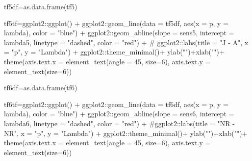 \documentclass[
  12pt,
  letterpaper,
]{book}
\newenvironment{Shaded}{\begin{snugshade}}{\end{snugshade}}
\newcommand{\AttributeTok}[1]{\textcolor[rgb]{0.40,0.45,0.13}{#1}}
\newcommand{\CommentTok}[1]{\textcolor[rgb]{0.37,0.37,0.37}{#1}}
\newcommand{\DecValTok}[1]{\textcolor[rgb]{0.68,0.00,0.00}{#1}}
\newcommand{\FunctionTok}[1]{\textcolor[rgb]{0.28,0.35,0.67}{#1}}
\newcommand{\NormalTok}[1]{\textcolor[rgb]{0.00,0.23,0.31}{#1}}
\newcommand{\OtherTok}[1]{\textcolor[rgb]{0.00,0.23,0.31}{#1}}
\newcommand{\SpecialCharTok}[1]{\textcolor[rgb]{0.37,0.37,0.37}{#1}}
\newcommand{\StringTok}[1]{\textcolor[rgb]{0.13,0.47,0.30}{#1}}
\begin{document}
\begin{Shaded}
\begin{Highlighting}[]
\NormalTok{tf5df}\OtherTok{=}\FunctionTok{as.data.frame}\NormalTok{(tf5)}

\NormalTok{tf5tf}\OtherTok{=}\NormalTok{ggplot2}\SpecialCharTok{::}\FunctionTok{ggplot}\NormalTok{() }\SpecialCharTok{+}
\NormalTok{  ggplot2}\SpecialCharTok{::}\FunctionTok{geom\_line}\NormalTok{(}\AttributeTok{data =}\NormalTok{ tf5df, }\FunctionTok{aes}\NormalTok{(}\AttributeTok{x =}\NormalTok{ p, }\AttributeTok{y =}\NormalTok{ lambda), }\AttributeTok{color =} \StringTok{"blue"}\NormalTok{) }\SpecialCharTok{+}
\NormalTok{  ggplot2}\SpecialCharTok{::}\FunctionTok{geom\_abline}\NormalTok{(}\AttributeTok{slope =}\NormalTok{ sens5, }\AttributeTok{intercept =}\NormalTok{ lambda5, }\AttributeTok{linetype =} \StringTok{"dashed"}\NormalTok{, }\AttributeTok{color =} \StringTok{"red"}\NormalTok{) }\SpecialCharTok{+}
 \CommentTok{\# ggplot2::labs(title = "J {-} A", x = "p", y = "Lambda") +}
\NormalTok{  ggplot2}\SpecialCharTok{::}\FunctionTok{theme\_minimal}\NormalTok{()}\SpecialCharTok{+}
  \FunctionTok{ylab}\NormalTok{(}\StringTok{""}\NormalTok{)}\SpecialCharTok{+}\FunctionTok{xlab}\NormalTok{(}\StringTok{""}\NormalTok{)}\SpecialCharTok{+}
  \FunctionTok{theme}\NormalTok{(}\AttributeTok{axis.text.x =} \FunctionTok{element\_text}\NormalTok{(}\AttributeTok{angle =} \DecValTok{45}\NormalTok{, }\AttributeTok{size=}\DecValTok{6}\NormalTok{),}
        \AttributeTok{axis.text.y =} \FunctionTok{element\_text}\NormalTok{(}\AttributeTok{size=}\DecValTok{6}\NormalTok{))}

\NormalTok{tf6df}\OtherTok{=}\FunctionTok{as.data.frame}\NormalTok{(tf6)}

\NormalTok{tf6tf}\OtherTok{=}\NormalTok{ggplot2}\SpecialCharTok{::}\FunctionTok{ggplot}\NormalTok{() }\SpecialCharTok{+}
\NormalTok{  ggplot2}\SpecialCharTok{::}\FunctionTok{geom\_line}\NormalTok{(}\AttributeTok{data =}\NormalTok{ tf6df, }\FunctionTok{aes}\NormalTok{(}\AttributeTok{x =}\NormalTok{ p, }\AttributeTok{y =}\NormalTok{ lambda), }\AttributeTok{color =} \StringTok{"blue"}\NormalTok{) }\SpecialCharTok{+}
\NormalTok{  ggplot2}\SpecialCharTok{::}\FunctionTok{geom\_abline}\NormalTok{(}\AttributeTok{slope =}\NormalTok{ sens6, }\AttributeTok{intercept =}\NormalTok{ lambda6, }\AttributeTok{linetype =} \StringTok{"dashed"}\NormalTok{, }\AttributeTok{color =} \StringTok{"red"}\NormalTok{) }\SpecialCharTok{+}
  \CommentTok{\#ggplot2::labs(title = "NR {-} NR", x = "p", y = "Lambda") +}
\NormalTok{  ggplot2}\SpecialCharTok{::}\FunctionTok{theme\_minimal}\NormalTok{()}\SpecialCharTok{+}
  \FunctionTok{ylab}\NormalTok{(}\StringTok{""}\NormalTok{)}\SpecialCharTok{+}\FunctionTok{xlab}\NormalTok{(}\StringTok{""}\NormalTok{)}\SpecialCharTok{+}
  \FunctionTok{theme}\NormalTok{(}\AttributeTok{axis.text.x =} \FunctionTok{element\_text}\NormalTok{(}\AttributeTok{angle =} \DecValTok{45}\NormalTok{, }\AttributeTok{size=}\DecValTok{6}\NormalTok{),}
        \AttributeTok{axis.text.y =} \FunctionTok{element\_text}\NormalTok{(}\AttributeTok{size=}\DecValTok{6}\NormalTok{))}


\end{Highlighting}
\end{Shaded}
\end{document}
